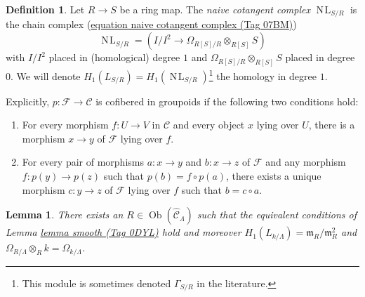 \documentclass{amsart}
\theoremstyle{plain}
\newtheorem{lemma}[subsection]{Lemma}
\theoremstyle{definition}
\newtheorem{definition}[subsection]{Definition}
\theoremstyle{remark}
\numberwithin{equation}{subsection}
\def\Ob{\mathop{\mathrm{Ob}}\nolimits}
\def\NL{\mathop{N\!L}\nolimits}
\begin{document}
\begin{definition}
\label{algebra-definition-naive-cotangent-complex}
Let $R \to S$ be a ring map. The {\it naive cotangent complex}
$\NL_{S/R}$ is the chain complex (\href{https://stacks.math.columbia.edu/tag/07BM}{equation naive cotangent complex (Tag 07BM)})
$$
\NL_{S/R} = \left(I/I^2 \longrightarrow \Omega_{R[S]/R} \otimes_{R[S]} S\right)
$$
with $I/I^2$ placed in (homological) degree $1$ and
$\Omega_{R[S]/R} \otimes_{R[S]} S$ placed in degree $0$. We will denote
$H_1(L_{S/R}) = H_1(\NL_{S/R})$\footnote{This module is sometimes
denoted $\Gamma_{S/R}$ in the literature.} the homology in degree $1$.
\end{definition}

\noindent
Explicitly, $p: \mathcal{F} \to \mathcal{C}$ is cofibered in groupoids if
the following two conditions hold:
\begin{enumerate}
\item For every morphism $f: U \to V$ in $\mathcal{C}$ and every object
$x$ lying over $U$, there is a morphism $x \to y$ of $\mathcal{F}$ lying
over $f$.
\item For every pair of morphisms $a: x \to y$ and $b: x \to z$
of $\mathcal{F}$ and any morphism $f: p(y) \to p(z)$ such that $p(b) = f
\circ p(a)$, there exists a unique morphism $c: y \to z$ of $\mathcal
F$ lying over $f$ such that $b = c \circ a$.
\end{enumerate}


\begin{lemma}
\label{lemma-exists-smooth}
There exists an $R \in \Ob(\widehat{\mathcal{C}}_\Lambda)$
such that the equivalent conditions of Lemma \href{https://stacks.math.columbia.edu/tag/0DYL}{lemma smooth (Tag 0DYL)}
hold and moreover $H_1(L_{k/\Lambda}) = \mathfrak m_R/\mathfrak m_R^2$
and $\Omega_{R/\Lambda} \otimes_R k = \Omega_{k/\Lambda}$.
\end{lemma}
\end{document}

